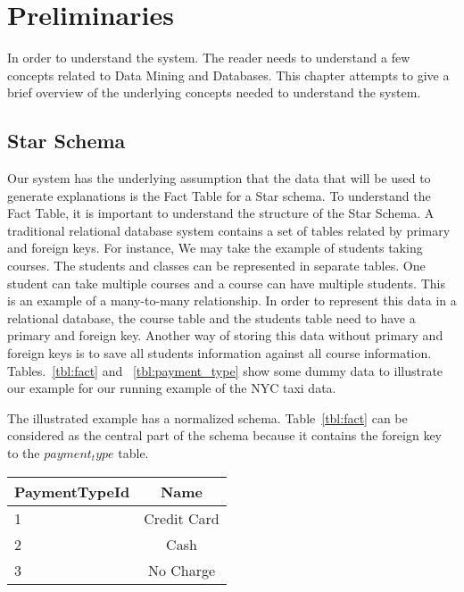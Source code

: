 \chapter{Preliminaries}
\label{chp:prelims}
In order to understand the system. The reader needs to understand a few concepts related to Data Mining and Databases. This chapter attempts to give a brief overview of the underlying concepts needed to understand the system.

\section{Star Schema}
Our system has the underlying assumption that the data that will be used to generate explanations is the Fact Table for a Star schema\citep{giovinazzo2000object,adamson2010star}. To understand the Fact Table, it is important to understand the structure of the Star Schema. A traditional relational database system contains a set of tables related by primary and foreign keys. For instance, We may take the example of students taking courses. The students and classes can be represented in separate tables. One student can take multiple courses and a course can have multiple students. This is an example of a many-to-many relationship.
In order to represent this data in a relational database, the course table and the students table need to have a primary and foreign key. Another way of storing this data without primary and foreign keys is to save all students information against all course information. Tables.~\ref{tbl:fact} and ~\ref{tbl:payment_type} show some dummy data to illustrate our example for our running example of the NYC taxi data.

The illustrated example has a normalized schema\citep{beeri1988sophisticate}. Table~\ref{tbl:fact} can be considered as the central part of the schema because it contains the foreign key to the $payment_type$ table.



\begin{center}
  \begin{tabular}{ | l | c | }
    \hline
    \textbf{PaymentTypeId} & \textbf{Name} \\ \hline
    1 & Credit Card  \\ \hline
    2 & Cash  \\ \hline
    3 & No Charge  \\
    \hline
  \end{tabular}
\end{center}
\label{tbl:payment_type}

